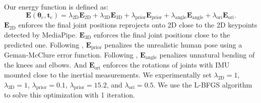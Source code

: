 \documentclass[sigconf,nonacm=true]{acmart}
\begin{document}
Our energy function is defined as:
\begin{equation}
\boldsymbol{E}(\boldsymbol{\theta}_{\mathrm{c}},\boldsymbol{t}_{\mathrm{c}})=\lambda_{\mathrm{2D}}\boldsymbol{E}_{\mathrm{2D}}+\lambda_{\mathrm{3D}}\boldsymbol{E}_{\mathrm{3D}}+\lambda_{\mathrm{prior}}\boldsymbol{E}_{\mathrm{prior}}+\lambda_{\mathrm{angle}}\boldsymbol{E}_{\mathrm{angle}}+\lambda_{\mathrm{ori}}\boldsymbol{E}_{\mathrm{ori}}.
\end{equation}
$\boldsymbol{E}_{\mathrm{2D}}$ enforces the final joint positions reprojects onto 2D close to the 2D keypoints detected by MediaPipe. $\boldsymbol{E}_{\mathrm{3D}}$ enforces the final joint positions close to the predicted one.
Following \cite{smplify}, $\boldsymbol{E}_{\mathrm{prior}}$ penalizes the unrealistic human pose using a Geman-McClure \cite{geman-mcclure} error function.
Following \cite{smplify}, $\boldsymbol{E}_{\mathrm{angle}}$ penalizes unnatural bending of the knees and elbows.
And $\boldsymbol{E}_{\mathrm{ori}}$ enforces the rotations of joints with IMU mounted close to the inertial measurements.
We experimentally set $\lambda_{\mathrm{2D}}=1$, $\lambda_{\mathrm{3D}}=1$, $\lambda_{\mathrm{prior}}=0.1$, $\lambda_{\mathrm{prior}}=15.2$, and $\lambda_{\mathrm{ori}}=0.5$.
We use the L-BFGS \cite{lbfgs} algorithm to solve this optimization with 1 iteration.
\end{document}
